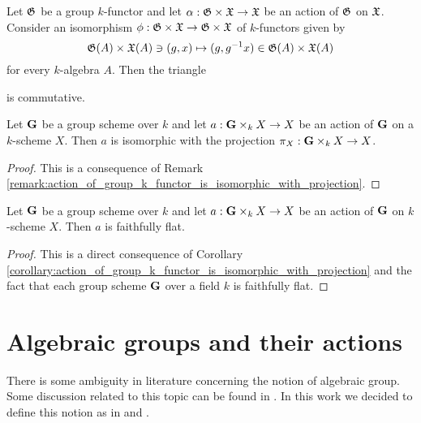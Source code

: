 \begin{remark}\label{remark:action_of_group_k_functor_is_isomorphic_with_projection}
Let ${\mathfrak G}$ be a group $k$-functor and let $\alpha:{\mathfrak G} \times {\mathfrak X} \rightarrow {\mathfrak X}$ be an action of ${\mathfrak G}$ on ${\mathfrak X}$. Consider an isomorphism $\phi:{\mathfrak G}\times {\mathfrak X}\rightarrow {\mathfrak G}\times {\mathfrak X}$ of $k$-functors given by
$${\mathfrak G}(A)\times {\mathfrak X}(A)\ni (g,x)\mapsto (g,g^{-1}x)\in {\mathfrak G}(A)\times {\mathfrak X}(A)$$
for every $k$-algebra $A$. Then the triangle
\begin{center}
\end{center}
is commutative.
\end{remark}

\begin{corollary}\label{corollary:action_of_group_k_functor_is_isomorphic_with_projection}
Let $\mathbf{G}$ be a group scheme over $k$ and let $a:\mathbf{G}\times_k X\rightarrow X$ be an action of $\mathbf{G}$ on a $k$-scheme $X$. Then $a$ is isomorphic with the projection $\pi_X:\mathbf{G}\times_k X\rightarrow X$.
\end{corollary}
\begin{proof}
This is a consequence of Remark \ref{remark:action_of_group_k_functor_is_isomorphic_with_projection}.
\end{proof}

\begin{corollary}\label{corollary:action_of_group_k_scheme_is_flat}
Let $\mathbf{G}$ be a group scheme over $k$ and let $a:\mathbf{G}\times_k X\rightarrow X$ be an action of $\mathbf{G}$ on $k$-scheme $X$. Then $a$ is faithfully flat.
\end{corollary}
\begin{proof}
This is a direct consequence of Corollary \ref{corollary:action_of_group_k_functor_is_isomorphic_with_projection} and the fact that each group scheme $\mathbf{G}$ over a field $k$ is faithfully flat.
\end{proof}

\section{Algebraic groups and their actions}
\noindent
There is some ambiguity in literature concerning the notion of algebraic group. Some discussion related to this topic can be found in {\cite[Notes on page 12]{milne2017algebraic}}. In this work we decided to define this notion as in \cite{milne2017algebraic} and \cite{demazure1970groupes}.

